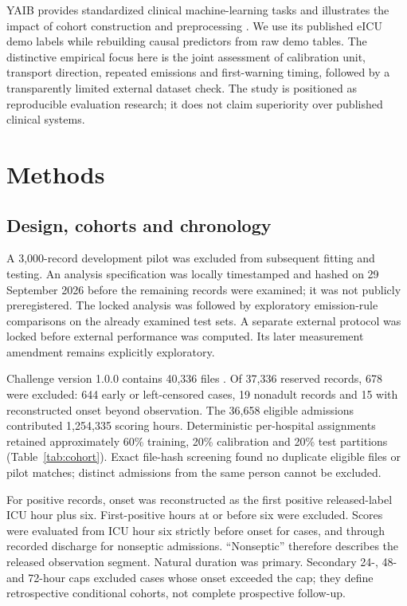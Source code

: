 \documentclass[preprint,12pt]{elsarticle}
\begin{document}
YAIB provides standardized clinical machine-learning tasks and illustrates the impact of cohort construction and preprocessing \cite{yaib}. We use its published eICU demo labels while rebuilding causal predictors from raw demo tables. The distinctive empirical focus here is the joint assessment of calibration unit, transport direction, repeated emissions and first-warning timing, followed by a transparently limited external dataset check. The study is positioned as reproducible evaluation research; it does not claim superiority over published clinical systems.

\section{Methods}
\subsection{Design, cohorts and chronology}
A 3,000-record development pilot was excluded from subsequent fitting and testing. An analysis specification was locally timestamped and hashed on 29 September 2026 before the remaining records were examined; it was not publicly preregistered. The locked analysis was followed by exploratory emission-rule comparisons on the already examined test sets. A separate external protocol was locked before external performance was computed. Its later measurement amendment remains explicitly exploratory.

Challenge version 1.0.0 contains 40,336 files \cite{reynadata,physionet}. Of 37,336 reserved records, 678 were excluded: 644 early or left-censored cases, 19 nonadult records and 15 with reconstructed onset beyond observation. The 36,658 eligible admissions contributed 1,254,335 scoring hours. Deterministic per-hospital assignments retained approximately 60\% training, 20\% calibration and 20\% test partitions (Table~\ref{tab:cohort}). Exact file-hash screening found no duplicate eligible files or pilot matches; distinct admissions from the same person cannot be excluded.

For positive records, onset was reconstructed as the first positive released-label ICU hour plus six. First-positive hours at or before six were excluded. Scores were evaluated from ICU hour six strictly before onset for cases, and through recorded discharge for nonseptic admissions. ``Nonseptic'' therefore describes the released observation segment. Natural duration was primary. Secondary 24-, 48- and 72-hour caps excluded cases whose onset exceeded the cap; they define retrospective conditional cohorts, not complete prospective follow-up.
\end{document}
